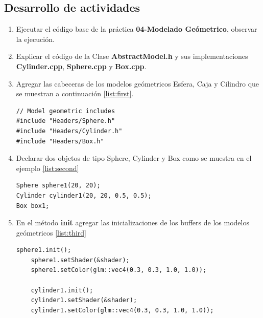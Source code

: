 \documentclass[11pt, english]{article}
\begin{document}
\subsection{Desarrollo de actividades}
\begin{enumerate}
\item Ejecutar el código base de la práctica \textbf{04-Modelado Geómetrico}, observar la ejecución.
\item Explicar el código de la Clase \textbf{AbstractModel.h} y sus implementaciones \textbf{Cylinder.cpp}, \textbf{Sphere.cpp} y \textbf{Box.cpp}.
\item  Agregar las cabeceras de los modelos geómetricos Esfera, Caja y Cilindro que se muestran a continuación \ref{list:first}.

\begin{lstlisting}[label={list:first},caption={Inclusión de cabeceras de las formas geómetricas.}, style=customc]
// Model geometric includes
#include "Headers/Sphere.h"
#include "Headers/Cylinder.h"
#include "Headers/Box.h"
\end{lstlisting}

\item Declarar dos objetos de tipo Sphere, Cylinder y Box como se muestra en el ejemplo \ref{list:second}
\begin{lstlisting}[label={list:second},caption={Declarar objetos de tipo esfera, cylindro y caja.}, style=customc]
Sphere sphere1(20, 20);
Cylinder cylinder1(20, 20, 0.5, 0.5);
Box box1;
\end{lstlisting}

\item En el método \textbf{init} agregar las inicializaciones de los buffers de los modelos geómetricos 
\ref{list:third}
\begin{lstlisting}[label={list:third},caption={Inicialización de esfera, cylindro y caja.}, style=customc]
	sphere1.init();
	sphere1.setShader(&shader);
	sphere1.setColor(glm::vec4(0.3, 0.3, 1.0, 1.0));

	cylinder1.init();
	cylinder1.setShader(&shader);
	cylinder1.setColor(glm::vec4(0.3, 0.3, 1.0, 1.0));


\end{lstlisting}
\end{enumerate}
\end{document}
